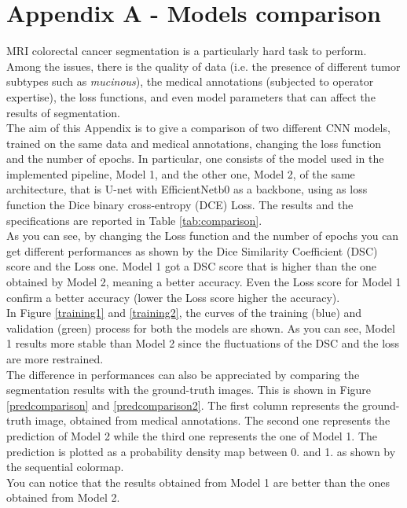 \documentclass{standalone}
\begin{document}
\chapter*{Appendix A - Models comparison}

MRI colorectal cancer segmentation is a particularly hard task to perform.
Among the issues, there is the quality of data (i.e. the presence of different tumor subtypes such as \textit{mucinous}), the medical annotations (subjected to operator expertise), the loss functions, and even model parameters that can affect the results of segmentation.\\
The aim of this Appendix is to give a comparison of two different CNN models, trained on the same data and medical annotations, changing the loss function and the number of epochs.
In particular, one consists of the model used in the implemented pipeline, Model 1, and the other one, Model 2, of the same architecture, that is U-net with EfficientNetb0 as a backbone, using as loss function the Dice binary cross-entropy (DCE) Loss.
The results and the specifications are reported in Table \ref{tab:comparison}.
\\
As you can see, by changing the Loss function and the number of epochs you can get different performances as shown by the Dice Similarity Coefficient (DSC) score and the Loss one.
Model 1 got a DSC score that is higher than the one obtained by Model 2, meaning a better accuracy.
Even the Loss score for Model 1 confirm a better accuracy (lower the Loss score higher the accuracy).
\\
In Figure \ref{training1} and \ref{training2}, the curves of the training (blue) and validation (green) process for both the models are shown.
As you can see, Model 1 results more stable than Model 2 since the fluctuations of the DSC and the loss are more restrained.
\\
The difference in performances can also be appreciated by comparing the segmentation results with the ground-truth images.
This is shown in Figure \ref{predcomparison} and \ref{predcomparison2}.
The first column represents the ground-truth image, obtained from medical annotations. 
The second one represents the prediction of Model 2 while the third one represents the one of Model 1.
The prediction is plotted as a probability density map between 0. and 1. as shown by the sequential colormap.
\\
You can notice that the results obtained from Model 1 are better than the ones obtained from Model 2.
\end{document}
